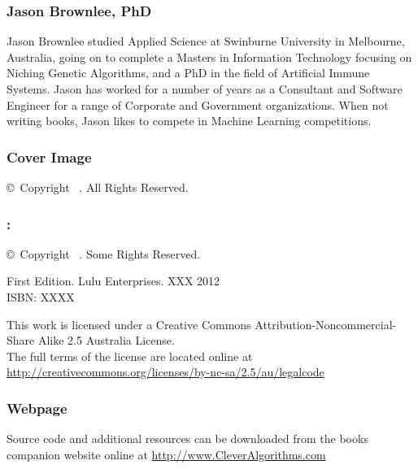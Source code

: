 

\vspace*{\fill}
\begin{flushleft}
\begin{small}

\subsubsection*{Jason Brownlee, PhD}
Jason Brownlee studied Applied Science at Swinburne University in Melbourne, Australia, going on to complete a Masters in Information Technology focusing on Niching Genetic Algorithms, and a PhD in the field of Artificial Immune Systems. Jason has worked for a number of years as a Consultant and Software Engineer for a range of Corporate and Government organizations. When not writing books, Jason likes to compete in Machine Learning competitions.

\subsubsection*{Cover Image}
\copyright\ Copyright \mybookdate\ \mybookauthor. All Rights Reserved. \\
\vspace{0.5cm}

\subsubsection*{\mybooktitle: \mybooksubtitle}
\copyright\ Copyright \mybookdate\ \mybookauthor. Some Rights Reserved. \\
\vspace{0.5cm}

First Edition. Lulu Enterprises. XXX 2012  \\
ISBN: XXXX \\
\vspace{0.5cm}

This work is licensed under a Creative Commons Attribution\--Noncommercial\--Share Alike 2.5 Australia License. \\
The full terms of the license are located online at \url{http://creativecommons.org/licenses/by-nc-sa/2.5/au/legalcode} \\
\vspace{0.5cm}

\subsubsection*{Webpage}
Source code and additional resources can be downloaded from the books companion website online at \url{http://www.CleverAlgorithms.com}

\end{small}
\end{flushleft}

